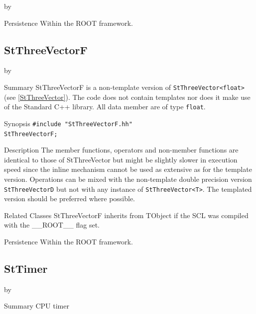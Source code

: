 \documentclass[twoside]{article}
\newcommand{\name}[1]{\textsf{#1}}%
\newcommand{\entrylabel}[1]{\mbox{\textbf{{#1}}}\hfil}%
\newenvironment{entry}
{\begin{list}{}%
    {\renewcommand{\makelabel}{\entrylabel}%
     \setlength{\labelwidth}{90pt}%
     \setlength{\leftmargin}{\labelwidth}
     \advance\leftmargin by \labelsep%
      }%
    }%
  {\end{list}}
\newcommand{\Entrylabel}[1]%
{\raisebox{0pt}[1ex][0pt]{\makebox[\labelwidth][l]%
    {\parbox[t]{\labelwidth}{\hspace{0pt}\textbf{{#1}}}}}}
\newenvironment{Entry}%
{\renewcommand{\entrylabel}{\Entrylabel}\begin{entry}}%
  {\end{entry}}
\begin{document}
\begin{description}
\begin{Entry}
\item[Persistence]
    Within the ROOT framework.

\end{Entry}

%
%
\subsection{StThreeVectorF }
\begin{Entry}
\item[Summary]
    StThreeVectorF is a non-template version of \verb+StThreeVector<float>+
    (see \ref{StThreeVector}). The code does not contain templates nor
    does it make use of the Standard C++ library. All data member are of
    type \texttt{float}.
    
\item[Synopsis]
    \verb+#include "StThreeVectorF.hh"+ \\
    \verb+StThreeVectorF;+
    
\item[Description]       
    The member functions, operators and non-member functions are identical
    to those of StThreeVector but might be slightly slower in execution speed
    since the inline mechanism cannot be used as extensive as for the template
    version. Operations can be mixed with the non-template double precision version
    \texttt{StThreeVectorD} but not with any instance of \verb+StThreeVector<T>+.
    The templated version should be preferred where possible.

\item[Related Classes]
    StThreeVectorF inherits from TObject 
    if the SCL was compiled with the \name{\_\_ROOT\_\_} flag set.

\item[Persistence]
    Within the ROOT framework.

\end{Entry}

\clearpage

%
%
\subsection{StTimer }
\begin{Entry}
\item[Summary]
    CPU timer
    

\end{Entry}
\end{description}
\end{document}
